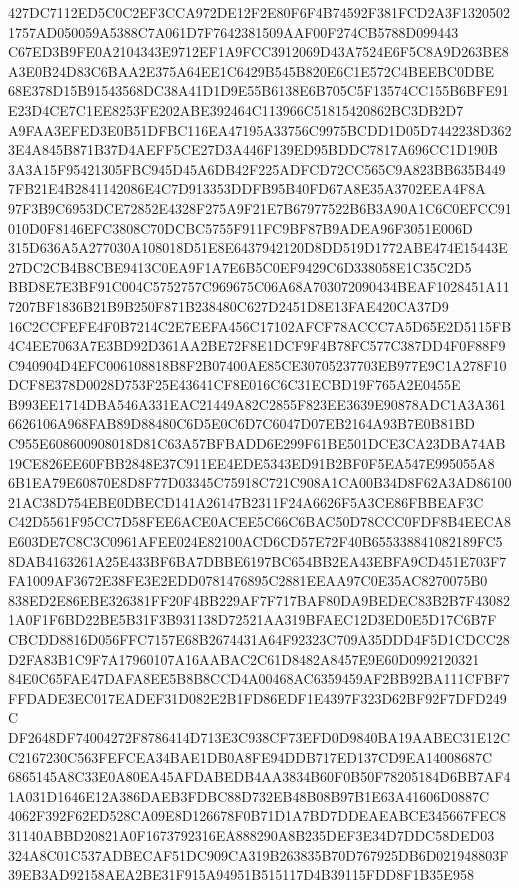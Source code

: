 \documentclass[UTF8,fontset=fandol,zihao=-4,a4paper]{ctexart}
\begin{document}
{{427DC7112ED5C0C2EF3CCA972DE12F2E80F6F4B74592F381FCD2A3F13205021757AD050059A5388C7A061D7F7642381509AAF00F274CB5788D099443
C67ED3B9FE0A2104343E9712EF1A9FCC3912069D43A7524E6F5C8A9D263BE8A3E0B24D83C6BAA2E375A64EE1C6429B545B820E6C1E572C4BEEBC0DBE
68E378D15B91543568DC38A41D1D9E55B6138E6B705C5F13574CC155B6BFE91E23D4CE7C1EE8253FE202ABE392464C113966C51815420862BC3DB2D7
A9FAA3EFED3E0B51DFBC116EA47195A33756C9975BCDD1D05D7442238D3623E4A845B871B37D4AEFF5CE27D3A446F139ED95BDDC7817A696CC1D190B
3A3A15F95421305FBC945D45A6DB42F225ADFCD72CC565C9A823BB635B4497FB21E4B2841142086E4C7D913353DDFB95B40FD67A8E35A3702EEA4F8A
97F3B9C6953DCE72852E4328F275A9F21E7B67977522B6B3A90A1C6C0EFCC91010D0F8146EFC3808C70DCBC5755F911FC9BF87B9ADEA96F3051E006D
315D636A5A277030A108018D51E8E6437942120D8DD519D1772ABE474E15443E27DC2CB4B8CBE9413C0EA9F1A7E6B5C0EF9429C6D338058E1C35C2D5
BBD8E7E3BF91C004C5752757C969675C06A68A703072090434BEAF1028451A117207BF1836B21B9B250F871B238480C627D2451D8E13FAE420CA37D9
16C2CCFEFE4F0B7214C2E7EEFA456C17102AFCF78ACCC7A5D65E2D5115FB4C4EE7063A7E3BD92D361AA2BE72F8E1DCF9F4B78FC577C387DD4F0F88F9
C940904D4EFC006108818B8F2B07400AE85CE30705237703EB977E9C1A278F10DCF8E378D0028D753F25E43641CF8E016C6C31ECBD19F765A2E0455E
B993EE1714DBA546A331EAC21449A82C2855F823EE3639E90878ADC1A3A3616626106A968FAB89D88480C6D5E0C6D7C6047D07EB2164A93B7E0B81BD
C955E608600908018D81C63A57BFBADD6E299F61BE501DCE3CA23DBA74AB19CE826EE60FBB2848E37C911EE4EDE5343ED91B2BF0F5EA547E995055A8
6B1EA79E60870E8D8F77D03345C75918C721C908A1CA00B34D8F62A3AD8610021AC38D754EBE0DBECD141A26147B2311F24A6626F5A3CE86FBBEAF3C
C42D5561F95CC7D58FEE6ACE0ACEE5C66C6BAC50D78CCC0FDF8B4EECA8E603DE7C8C3C0961AFEE024E82100ACD6CD57E72F40B655338841082189FC5
8DAB4163261A25E433BF6BA7DBBE6197BC654BB2EA43EBFA9CD451E703F7FA1009AF3672E38FE3E2EDD0781476895C2881EEAA97C0E35AC8270075B0
838ED2E86EBE326381FF20F4BB229AF7F717BAF80DA9BEDEC83B2B7F430821A0F1F6BD22BE5B31F3B931138D72521AA319BFAEC12D3ED0E5D17C6B7F
CBCDD8816D056FFC7157E68B2674431A64F92323C709A35DDD4F5D1CDCC28D2FA83B1C9F7A17960107A16AABAC2C61D8482A8457E9E60D0992120321
84E0C65FAE47DAFA8EE5B8B8CCD4A00468AC6359459AF2BB92BA111CFBF7FFDADE3EC017EADEF31D082E2B1FD86EDF1E4397F323D62BF92F7DFD249C
DF2648DF74004272F8786414D713E3C938CF73EFD0D9840BA19AABEC31E12CC2167230C563FEFCEA34BAE1DB0A8FE94DDB717ED137CD9EA14008687C
6865145A8C33E0A80EA45AFDABEDB4AA3834B60F0B50F78205184D6BB7AF41A031D1646E12A386DAEB3FDBC88D732EB48B08B97B1E63A41606D0887C
4062F392F62ED528CA09E8D126678F0B71D1A7BD7DDEAEABCE345667FEC831140ABBD20821A0F1673792316EA888290A8B235DEF3E34D7DDC58DED03
324A8C01C537ADBECAF51DC909CA319B263835B70D767925DB6D021948803F39EB3AD92158AEA2BE31F915A94951B515117D4B39115FDD8F1B35E958
}}
\end{document}

